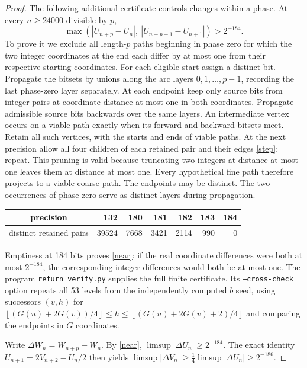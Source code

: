 \documentclass[11pt,letterpaper]{article}
\newcommand{\fl}[1]{\left\lfloor#1\right\rfloor}
\begin{document}
\begin{proof}
The following additional certificate controls changes within a phase. At every $n\ge24000$ divisible by $p$,
\begin{equation}
 \max(|U_{n+p}-U_n|,\ |U_{n+p+1}-U_{n+1}|)>2^{-184}.\label{near}
\end{equation}
To prove it we exclude all length-$p$ paths beginning in phase zero for which the two integer coordinates at the end each differ by at most one from their respective starting coordinates. For each eligible start assign a distinct bit. Propagate the bitsets by unions along the arc layers $0,1,\ldots,p-1$, recording the last phase-zero layer separately. At each endpoint keep only source bits from integer pairs at coordinate distance at most one in both coordinates. Propagate admissible source bits backwards over the same layers. An intermediate vertex occurs on a viable path exactly when its forward and backward bitsets meet. Retain all such vertices, with the starts and ends of viable paths. At the next precision allow all four children of each retained pair and their edges \eqref{step}; repeat. This pruning is valid because truncating two integers at distance at most one leaves them at distance at most one. Every hypothetical fine path therefore projects to a viable coarse path. The endpoints may be distinct. The two occurrences of phase zero serve as distinct layers during propagation.
\begin{center}
\begin{tabular}{c|rrrrrr}
precision &132&180&181&182&183&184\\\hline
distinct retained pairs &39524&7668&3421&2114&990&0
\end{tabular}
\end{center}
Emptiness at 184 bits proves \eqref{near}: if the real coordinate differences were both at most $2^{-184}$, the corresponding integer differences would both be at most one. The program \texttt{return\_verify.py} supplies the full finite certificate. Its \texttt{--cross-check} option repeats all 53 levels from the independently computed $b$ seed, using successors $(v,h)$ for $\fl{(G(u)+2G(v))/4}\le h\le\fl{(G(u)+2G(v)+2)/4}$ and comparing the endpoints in $G$ coordinates.

Write $\Delta W_n=W_{n+p}-W_n$. By \eqref{near}, $\limsup|\Delta U_n|\ge2^{-184}$. The exact identity $U_{n+1}=2V_{n+2}-U_n/2$ then yields
$\limsup|\Delta V_n|\ge\tfrac14\limsup|\Delta U_n|\ge2^{-186}$.


\end{proof}
\end{document}
